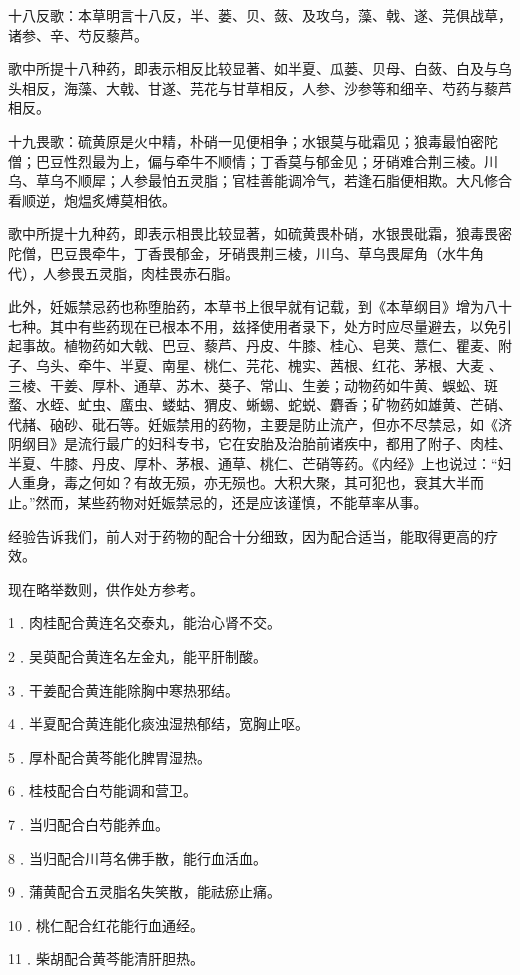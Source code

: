 \documentclass[12pt,UTF8]{ctexbook}
\begin{document}
十八反歌：本草明言十八反，半、蒌、贝、蔹、及攻乌，藻、戟、遂、芫俱战草，诸参、辛、芍反藜芦。

歌中所提十八种药，即表示相反比较显著、如半夏、瓜蒌、贝母、白蔹、白及与乌头相反，海藻、大戟、甘遂、芫花与甘草相反，人参、沙参等和细辛、芍药与藜芦相反。

十九畏歌：硫黄原是火中精，朴硝一见便相争；水银莫与砒霜见；狼毒最怕密陀僧；巴豆性烈最为上，偏与牵牛不顺情；丁香莫与郁金见；牙硝难合荆三棱。川乌、草乌不顺犀；人参最怕五灵脂；官桂善能调冷气，若逢石脂便相欺。大凡修合看顺逆，炮煴炙煿莫相依。

歌中所提十九种药，即表示相畏比较显著，如硫黄畏朴硝，水银畏砒霜，狼毒畏密陀僧，巴豆畏牵牛，丁香畏郁金，牙硝畏荆三棱，川乌、草乌畏犀角（水牛角代），人参畏五灵脂，肉桂畏赤石脂。

此外，妊娠禁忌药也称堕胎药，本草书上很早就有记载，到《本草纲目》增为八十七种。其中有些药现在已根本不用，兹择使用者录下，处方时应尽量避去，以免引起事故。植物药如大戟、巴豆、藜芦、丹皮、牛膝、桂心、皂荚、薏仁、瞿麦、附子、乌头、牵牛、半夏、南星、桃仁、芫花、槐实、茜根、红花、茅根、大麦
、三棱、干姜、厚朴、通草、苏木、葵子、常山、生姜；动物药如牛黄、蜈蚣、斑蝥、水蛭、虻虫、䗪虫、蝼蛄、猬皮、蜥蜴、蛇蜕、麝香；矿物药如雄黄、芒硝、代赭、硇砂、砒石等。妊娠禁用的药物，主要是防止流产，但亦不尽禁忌，如《济阴纲目》是流行最广的妇科专书，它在安胎及治胎前诸疾中，都用了附子、肉桂、半夏、牛膝、丹皮、厚朴、茅根、通草、桃仁、芒硝等药。《内经》上也说过：“妇人重身，毒之何如？有故无殒，亦无殒也。大积大聚，其可犯也，衰其大半而止。”然而，某些药物对妊娠禁忌的，还是应该谨慎，不能草率从事。

经验告诉我们，前人对于药物的配合十分细致，因为配合适当，能取得更高的疗效。

现在略举数则，供作处方参考。

1﹒肉桂配合黄连名交泰丸，能治心肾不交。

2﹒吴萸配合黄连名左金丸，能平肝制酸。

3﹒干姜配合黄连能除胸中寒热邪结。

4﹒半夏配合黄连能化痰浊湿热郁结，宽胸止呕。

5﹒厚朴配合黄芩能化脾胃湿热。

6﹒桂枝配合白芍能调和营卫。

7﹒当归配合白芍能养血。

8﹒当归配合川芎名佛手散，能行血活血。

9﹒蒲黄配合五灵脂名失笑散，能祛瘀止痛。

10﹒桃仁配合红花能行血通经。

11﹒柴胡配合黄芩能清肝胆热。
\end{document}
